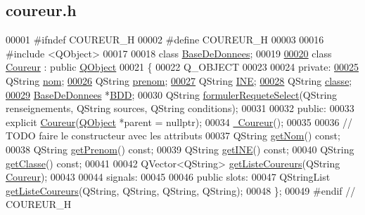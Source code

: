 \hypertarget{coureur_8h_source}{}\subsection{coureur.\+h}
\label{coureur_8h_source}

\begin{DoxyCode}
00001 \textcolor{preprocessor}{#ifndef COUREUR\_H}
00002 \textcolor{preprocessor}{#define COUREUR\_H}
00003 
00016 \textcolor{preprocessor}{#include <QObject>}
00017 
00018 \textcolor{keyword}{class }\hyperlink{class_base_de_donnees}{BaseDeDonnees};
00019 
\hyperlink{class_coureur}{00020} \textcolor{keyword}{class }\hyperlink{class_coureur}{Coureur} : \textcolor{keyword}{public} \hyperlink{class_q_object}{QObject}
00021 \{
00022     Q\_OBJECT
00023 
00024 \textcolor{keyword}{private}:
\hyperlink{class_coureur_ac96ff159efad8a6fd3abbe1a37b51c24}{00025}     QString \hyperlink{class_coureur_ac96ff159efad8a6fd3abbe1a37b51c24}{nom};
\hyperlink{class_coureur_a5e37d256b17765909423e183879c9e58}{00026}     QString \hyperlink{class_coureur_a5e37d256b17765909423e183879c9e58}{prenom};
\hyperlink{class_coureur_ac4028301fbd425848c2a81d69f8f94ac}{00027}     QString \hyperlink{class_coureur_ac4028301fbd425848c2a81d69f8f94ac}{INE};
\hyperlink{class_coureur_a274255068bb91a5c66a365cd10528280}{00028}     QString \hyperlink{class_coureur_a274255068bb91a5c66a365cd10528280}{classe};
\hyperlink{class_coureur_a9890c210d97e593644b22cb0e8228527}{00029}     \hyperlink{class_base_de_donnees}{BaseDeDonnees} *\hyperlink{class_coureur_a9890c210d97e593644b22cb0e8228527}{BDD}; 
00030     QString \hyperlink{class_coureur_ad46f9151c1d00fbddb31c352ba331d78}{formulerRequeteSelect}(QString renseignements, QString sources, QString 
      conditions);
00031 
00032 \textcolor{keyword}{public}:
00033     \textcolor{keyword}{explicit} \hyperlink{class_coureur_af3a5607d96a0960b1666164f6a74d539}{Coureur}(\hyperlink{class_q_object}{QObject} *parent = \textcolor{keyword}{nullptr});
00034     \hyperlink{class_coureur_acbaa69246e4da18c0951f651f9ab3d69}{~Coureur}();
00035 
00036     \textcolor{comment}{// TODO faire le constructeur avec les attributs}
00037     QString \hyperlink{class_coureur_a1808f13910638c6f2a57e87be522adf3}{getNom}() \textcolor{keyword}{const};
00038     QString \hyperlink{class_coureur_a54a92a0fcaf7db9079f9d3f5d043539c}{getPrenom}() \textcolor{keyword}{const};
00039     QString \hyperlink{class_coureur_a724d13c5c34757fcd70491da44a918e3}{getINE}() \textcolor{keyword}{const};
00040     QString \hyperlink{class_coureur_aa611e208767c4db4999e00296aa12632}{getClasse}() \textcolor{keyword}{const};
00041 
00042     QVector<QString> \hyperlink{class_coureur_a1d9f2cb15f74ff1c7b20fde081b5c5d6}{getListeCoureurs}(QString \hyperlink{class_coureur}{Coureur});
00043 
00044 signals:
00045 
00046 \textcolor{keyword}{public} slots:
00047     QStringList \hyperlink{class_coureur_a1d9f2cb15f74ff1c7b20fde081b5c5d6}{getListeCoureurs}(QString, QString, QString, QString);
00048 \};
00049 \textcolor{preprocessor}{#endif // COUREUR\_H}
\end{DoxyCode}
